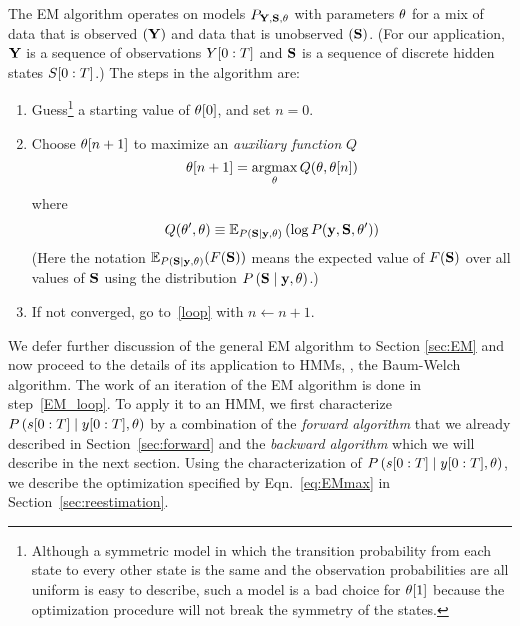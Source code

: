 The EM algorithm operates on models $P_{{\bf Y},{\bf S},\theta} $ with
parameters $\theta$ for a mix of data that is observed $({\bf Y})$ and
data that is unobserved $({\bf S})$.  (For our application, ${\bf Y}$ is a
sequence of observations $Y[0:T]$ and ${\bf S}$ is a sequence of
discrete hidden states $S[0:T]$.)  The steps in the algorithm
are:
\begin{enumerate}
\item Guess\footnote{Although a symmetric model in which the
    transition probability from each state to every other state is the
    same and the observation probabilities are all uniform is easy to
    describe, such a model is a bad choice for ${\theta}{[1]}$
    because the optimization procedure will not break the symmetry of
    the states.}  a starting value of ${\theta}{[0]}$, and set
  $n=0$.
\item \label{EM_loop} Choose ${\theta}{[n+1]}$ to maximize
  an \emph{auxiliary function} $Q$
  \begin{equation}
    \label{eq:EMmax}
    {\theta}{[n+1]} = \operatorname*{argmax}_{\theta} Q(\theta,{\theta}{[n]})
  \end{equation}
  where
  \begin{equation}
    \label{eq:Qdef}
    Q(\theta',\theta) \equiv \mathbb{E}_{P \left({\bf S}\mid \mathbf{y},\theta \right)}
    \left( \log P(\mathbf{y},{\bf S},\theta') \right)
  \end{equation}
  (Here the notation $\mathbb{E}_{P \left({\bf S}\mid \mathbf{y},\theta
    \right)}(F({\bf S}))$ means the expected value of $F({\bf S})$ over all
  values of ${\bf S}$ using the distribution $P \left({\bf S}\mid \mathbf{y},\theta
  \right)$.)%
\item If not converged, go to~\ref{loop} with $n \leftarrow n+1.$
\end{enumerate}

We defer further discussion of the general EM algorithm to Section
\ref{sec:EM} and now proceed to the details of its application to
HMMs, \ie, the Baum-Welch algorithm.  The work of an iteration of the
EM algorithm is done in step~\ref{EM_loop}.  To apply it to an HMM, we
first characterize $P \left(s[0:T]\mid y[0:T], \theta
\right)$ by a combination of the \emph{forward algorithm} that we
already described in Section~\ref{sec:forward} and the \emph{backward
  algorithm} which we will describe in the next section.  Using the
characterization of $P \left(s[0:T]\mid y[0:T], \theta
\right)$, we describe the optimization specified by
Eqn.~\eqref{eq:EMmax} in Section~\ref{sec:reestimation}.

